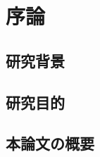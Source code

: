 \chapter{序論}

\section{研究背景}


\section{研究目的}


\section{本論文の概要}


\begin{thebibliography}{9}
\end{thebibliography}